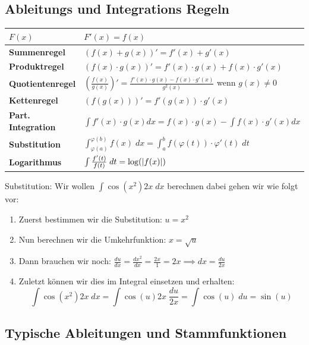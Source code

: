 \subsection{Ableitungs und Integrations Regeln}

\renewcommand\arraystretch{1.8}
\begin{center}
    \begin{tabular}{l|l}
        $F(x)$ & $F'(x) = f(x)$ \\
        \hline
        
        \textbf{Summenregel} & $(f(x) + g(x))' = f'(x) + g'(x)$ \\
		\textbf{Produktregel} & $(f(x) \cdot g(x))' = f'(x) \cdot g(x) + f(x) \cdot g'(x)$ \\
		\textbf{Quotientenregel} & $\left( \frac{f(x)}{g(x)} \right)' = \frac{f'(x) \cdot g(x) - f(x) \cdot g'(x)}{g^2(x)}$ wenn $g(x) \neq 0$ \\
		\textbf{Kettenregel} & $(f(g(x)))' = f'(g(x)) \cdot g'(x)$ \\
		\textbf{Part. Integration} & $\int f'(x) \cdot g(x) dx = f(x) \cdot g(x) - \int f(x) \cdot g'(x) dx$ \\
		\textbf{Substitution} & $\int_{\varphi(a)}^{\varphi(b)} f(x) \; dx = \int_a^b f(\varphi(t)) \cdot \varphi'(t) \; dt$ \\
		\textbf{Logarithmus} & $\int \frac{f'(t)}{f(t)} \; dt = \log(\abs{f(x)})$ \\
    \end{tabular}
\end{center}
\renewcommand{\arraystretch}{1}
  
\Bsp Substitution: Wir wollen $\int \cos(x^2) 2x \; dx$ berechnen dabei gehen wir wie folgt vor:

\begin{enumerate}
	\item Zuerst bestimmen wir die Substitution: $u = x^2$
	\item Nun berechnen wir die Umkehrfunktion: $x = \sqrt{u}$
	\item Dann brauchen wir noch: $\frac{du}{dx} = \frac{dx^2}{dx} = \frac{2x}{1} = 2x \implies dx = \frac{du}{2x}$
	\item Zuletzt können wir dies im Integral einsetzen und erhalten:
		$$\int \cos(x^2) 2x \; dx = \int \cos(u) 2x \; \frac{du}{2x} = \int \cos(u) \; du = \sin(u)$$
	
\end{enumerate}


\subsection{Typische Ableitungen und Stammfunktionen}

